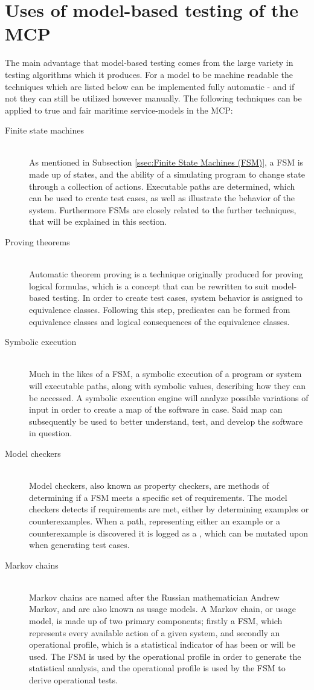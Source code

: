 \section{Uses of model-based testing of the MCP}
The main advantage that model-based testing comes from the large variety in testing algorithms which it produces. For a model to be machine readable the techniques which are listed below can be implemented fully automatic - and if not they can still be utilized however manually. The following techniques can be applied to true and fair maritime service-models in the MCP: \newpage
\begin{description}
	\item[Finite state machines]\ \\
		As mentioned in Subsection \ref{ssec:Finite State Machines (FSM)}, a FSM is made up of states, and the ability of a simulating program to change state through a collection of actions. Executable paths are determined, which can be used to create test cases, as well as illustrate the behavior of the system. Furthermore FSMs are closely related to the further techniques, that will be explained in this section.
	\item[Proving theorems]\ \\
		Automatic theorem proving is a technique originally produced for proving logical formulas, which is a concept that can be rewritten to suit model-based testing. In order to create test cases, system behavior is assigned to equivalence classes. Following this step, predicates can be formed from equivalence classes and logical consequences of the equivalence classes. 
	\item[Symbolic execution]\ \\
		Much in the likes of a FSM, a symbolic execution of a program or system will executable paths, along with symbolic values, describing how they can be accessed. A symbolic execution engine will analyze possible variations of input in order to create a map of the software in case. Said map can subsequently be used to better understand, test, and develop the software in question.
	\item[Model checkers]\ \\
		Model checkers, also known as property checkers, are methods of determining if a FSM meets a specific set of requirements. The model checkers detects if requirements are met, either by determining examples or counterexamples. When a path, representing either an example or a counterexample is discovered it is logged as a , which can be mutated upon when generating test cases.
	\item[Markov chains]\ \\
		Markov chains are named after the Russian mathematician Andrew Markov, and are also known as usage models. A Markov chain, or usage model, is made up of two primary components; firstly a FSM, which represents every available action of a given system, and secondly an operational profile, which is a statistical indicator of has been or will be used. The FSM is used by the operational profile in order to generate the statistical analysis, and the operational profile is used by the FSM to derive operational tests.
\end{description}
